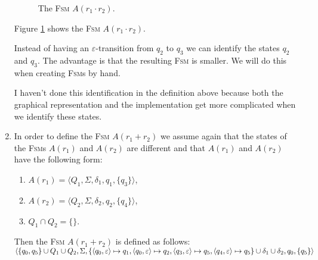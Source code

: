 \begin{enumerate}
      \begin{figure}[!ht]
        \centering
      \caption{The \textsc{Fsm} $A(r_1 \cdot r_2)$.}
      \label{fig:aConcat.eps}
      \end{figure}
      Figure \ref{fig:aConcat.eps} shows the \textsc{Fsm} $A(r_1 \cdot r_2)$.

      Instead of having an $\varepsilon$-transition from $q_2$ to $q_3$ we can identify the states $q_2$ and
      $q_3$.  The advantage is that the resulting \textsc{Fsm} is smaller.
      We will do this when creating \textsc{Fsm}s by hand.

      I haven't done this identification in the definition above because both the graphical representation and 
      the implementation get more complicated when we identify these states.
\item In order to define the \textsc{Fsm} $A(r_1 + r_2)$ we assume again that the states of the \textsc{Fsm}s
      $A(r_1)$ and $A(r_2)$ are different and that $A(r_1)$ and $A(r_2)$ have the following form:
      \begin{enumerate}
      \item $A(r_1) = \langle Q_1, \Sigma, \delta_1, q_1, \{ q_3 \}\rangle$,
      \item $A(r_2) = \langle Q_2, \Sigma, \delta_2, q_2, \{ q_4 \}\rangle$,
      \item $Q_1 \cap Q_2 = \{\}$.
      \end{enumerate}
      Then the \textsc{Fsm} $A(r_1 + r_2)$ is defined as follows:
      \\[0.2cm]
      \hspace*{0.8cm}
       $\langle \{ q_0, q_5 \} \cup Q_1 \cup Q_2, \Sigma, 
                \{ \pair(q_0,\varepsilon) \mapsto q_1, \pair(q_0,\varepsilon) \mapsto q_2,
                   \pair(q_3,\varepsilon) \mapsto q_5, \pair(q_4,\varepsilon) \mapsto q_5 \} 
                   \cup \delta_1 \cup \delta_2, q_0, \{ q_5 \} \rangle$


\end{enumerate}
